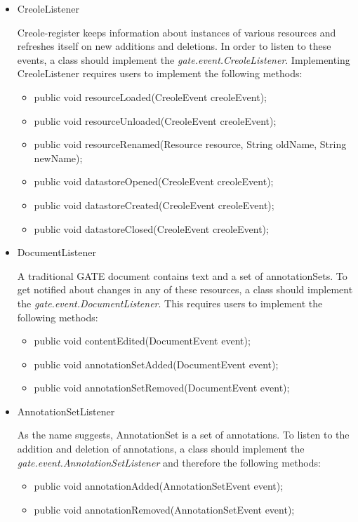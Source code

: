 \begin{itemize}
\item{CreoleListener}

	Creole-register keeps information about instances of various resources
	and refreshes itself on new additions and deletions. In order to listen
	to these events, a class should implement the
	\textit{gate.event.CreoleListener}. Implementing CreoleListener requires
	users to implement the following methods:

	\begin{itemize}
	\item{public void resourceLoaded(CreoleEvent creoleEvent);}
	\item{public void resourceUnloaded(CreoleEvent creoleEvent);}
	\item{public void resourceRenamed(Resource resource, String oldName, String newName);}
  	\item{public void datastoreOpened(CreoleEvent creoleEvent);}
   	\item{public void datastoreCreated(CreoleEvent creoleEvent);}
   	\item{public void datastoreClosed(CreoleEvent creoleEvent);}
	\end{itemize}

\item{DocumentListener}

	A traditional GATE document contains text and a set of annotationSets.
	To get notified about changes in any of these resources, a class should
	implement the \textit{gate.event.DocumentListener}. This requires users
	to implement the following methods:

	\begin{itemize}
	\item{public void contentEdited(DocumentEvent event);}
	\item{public void annotationSetAdded(DocumentEvent event);}
	\item{public void annotationSetRemoved(DocumentEvent event);}
	\end{itemize}

\item{AnnotationSetListener}

	As the name suggests, AnnotationSet is a set of
	annotations. To listen to the addition and deletion of annotations, a
	class should implement the \textit{gate.event.AnnotationSetListener} and
	therefore the following methods:

	\begin{itemize}
	\item{public void annotationAdded(AnnotationSetEvent event);}
	\item{public void annotationRemoved(AnnotationSetEvent event);}
	\end{itemize}


\end{itemize}
